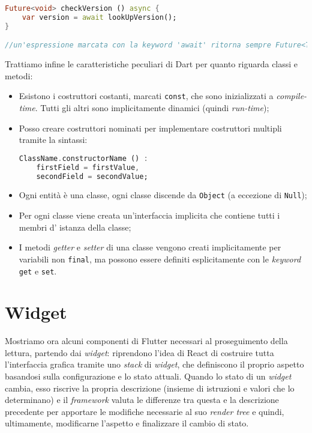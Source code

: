 \begin{appendices}
\begin{lstlisting}[language=dart, firstnumber=1,caption={Dart programmazione asincrona}]
Future<void> checkVersion () async {
    var version = await lookUpVersion();
}

//un'espressione marcata con la keyword 'await' ritorna sempre Future<T>
\end{lstlisting}

Trattiamo infine le caratteristiche peculiari di Dart per quanto riguarda classi e metodi:

\begin{itemize}
    \item Esistono i costruttori costanti, marcati \verb+const+, che sono inizializzati a \textit{compile-time}. Tutti gli altri sono implicitamente dinamici (quindi \textit{run-time});
    \item Posso creare costruttori nominati per implementare costruttori multipli tramite la sintassi:
\begin{lstlisting}[language=dart]
ClassName.constructorName () :
    firstField = firstValue,
    secondField = secondValue;
\end{lstlisting}
    \item Ogni entità è una classe, ogni classe discende da \verb+Object+ (a eccezione di \verb+Null+);
    \item Per ogni classe viene creata un'interfaccia implicita che contiene tutti i membri d' istanza della classe;
    \item I metodi \textit{getter} e \textit{setter} di una classe vengono creati implicitamente per variabili non \verb+final+, ma possono essere definiti esplicitamente con le \textit{keyword} \verb+get+ e \verb+set+.
\end{itemize}

\section{Widget}
Mostriamo ora alcuni componenti di Flutter necessari al proseguimento della lettura, partendo dai \textit{widget}: riprendono l'idea di React di costruire tutta l'interfaccia grafica tramite uno \textit{stack} di \textit{widget}, che definiscono il proprio aspetto basandosi sulla configurazione e lo stato attuali. Quando lo stato di un \textit{widget} cambia, esso riscrive la propria descrizione (insieme di istruzioni e valori che lo determinano) e il \textit{framework} valuta le differenze tra questa e la descrizione precedente per apportare le modifiche necessarie al suo \textit{render tree} e quindi, ultimamente, modificarne l'aspetto e finalizzare il cambio di stato.


\end{appendices}
